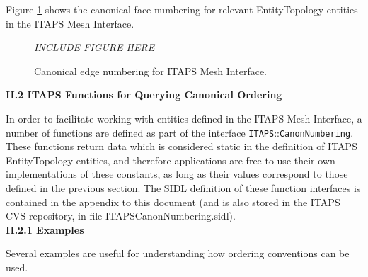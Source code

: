 \documentclass{article}
\begin{document}
Figure \ref{app-fig3} shows the canonical 
face numbering for relevant EntityTopology entities in the ITAPS 
Mesh Interface.\\

\begin{figure}[htbp]
\begin{center}
\emph{INCLUDE FIGURE HERE}
\caption{Canonical edge numbering for ITAPS Mesh Interface.}
\label{app-fig3}
\end{center}
\end{figure}

\begin{large}
\textbf{II.2 ITAPS Functions for Querying Canonical Ordering\\}    %
\end{large}

In order to facilitate working with entities defined in the ITAPS 
Mesh Interface, a number of functions are defined as part of 
the interface {\tt ITAPS}::{\tt CanonNumbering}. These functions return data 
which is considered static in the definition of ITAPS EntityTopology 
entities, and therefore applications are free to use their own 
implementations of these constants, as long as their values correspond 
to those defined in the previous section. The SIDL definition 
of these function interfaces is contained in the appendix to 
this document (and is also stored in the ITAPS CVS repository, 
in file ITAPSCanonNumbering.sidl).\\

\textbf{II.2.1 Examples\\}    %

Several examples are useful for understanding how ordering conventions 
can be used.
\end{document}
